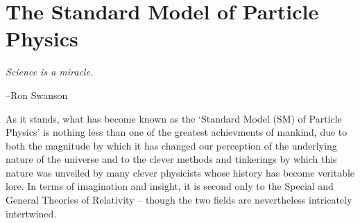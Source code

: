 \chapter{The Standard Model of Particle Physics}

	
\epigraph{\textit{Science is a miracle.}}{--Ron Swanson}


As it stands, what has become known as the `Standard Model (SM) of Particle Physics'
is nothing less than one of the greatest achievments of mankind, due to both
the magnitude by which it has changed our perception of the underlying
nature of the universe and to the clever methods and tinkerings by which this
nature was unveiled by many clever physicists whose history has become veritable lore.
In terms of imagination and insight, it is second only to the Special and General Theories of Relativity --
though the two fields are nevertheless intricately intertwined.

